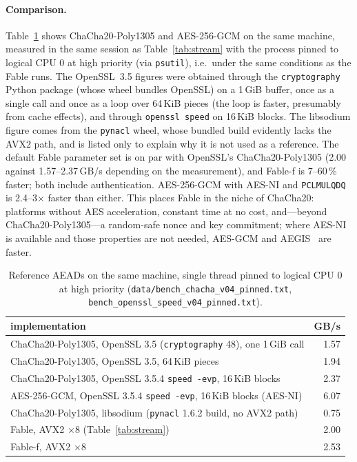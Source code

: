 \documentclass{iacrtrans}
\newcommand{\Fable}{\textsf{Fable}\xspace}
\newcommand{\FableF}{\textsf{Fable-f}\xspace}
\begin{document}
\paragraph{Comparison.} Table~\ref{tab:cmp} shows ChaCha20-Poly1305 and AES-256-GCM on the same machine, measured in the same session as Table~\ref{tab:stream} with the process pinned to logical CPU 0 at high priority (via \texttt{psutil}), i.e.\ under the same conditions as the \Fable runs. The OpenSSL~3.5 figures were obtained through the \texttt{cryptography} Python package (whose wheel bundles OpenSSL) on a 1\,GiB buffer, once as a single call and once as a loop over 64\,KiB pieces (the loop is faster, presumably from cache effects), and through \texttt{openssl speed} on 16\,KiB blocks. The libsodium figure comes from the \texttt{pynacl} wheel, whose bundled build evidently lacks the AVX2 path, and is listed only to explain why it is not used as a reference. The default \Fable parameter set is on par with OpenSSL's ChaCha20-Poly1305 (2.00 against 1.57--2.37\,GB/s depending on the measurement), and \FableF is 7--60\,\% faster; both include authentication. AES-256-GCM with AES-NI and \texttt{PCLMULQDQ} is 2.4--3$\times$ faster than either. This places \Fable in the niche of ChaCha20: platforms without AES acceleration, constant time at no cost, and---beyond ChaCha20-Poly1305---a random-safe nonce and key commitment; where AES-NI is available and those properties are not needed, AES-GCM and AEGIS~\cite{AEGIS13} are faster.

\begin{table}[htb]
\centering
\caption{Reference AEADs on the same machine, single thread pinned to logical CPU 0 at high priority (\texttt{data/bench\_chacha\_v04\_pinned.txt}, \texttt{bench\_openssl\_speed\_v04\_pinned.txt}).}
\label{tab:cmp}
\small
\begin{tabular}{lr}
\toprule
implementation & GB/s\\
\midrule
ChaCha20-Poly1305, OpenSSL 3.5 (\texttt{cryptography} 48), one 1\,GiB call & 1.57\\
ChaCha20-Poly1305, OpenSSL 3.5, 64\,KiB pieces & 1.94\\
ChaCha20-Poly1305, OpenSSL 3.5.4 \texttt{speed -evp}, 16\,KiB blocks & 2.37\\
AES-256-GCM, OpenSSL 3.5.4 \texttt{speed -evp}, 16\,KiB blocks (AES-NI) & 6.07\\
ChaCha20-Poly1305, libsodium (\texttt{pynacl} 1.6.2 build, no AVX2 path) & 0.75\\
\Fable, AVX2 $\times 8$ (Table~\ref{tab:stream}) & 2.00\\
\FableF, AVX2 $\times 8$ & 2.53\\
\bottomrule
\end{tabular}
\end{table}
\end{document}
